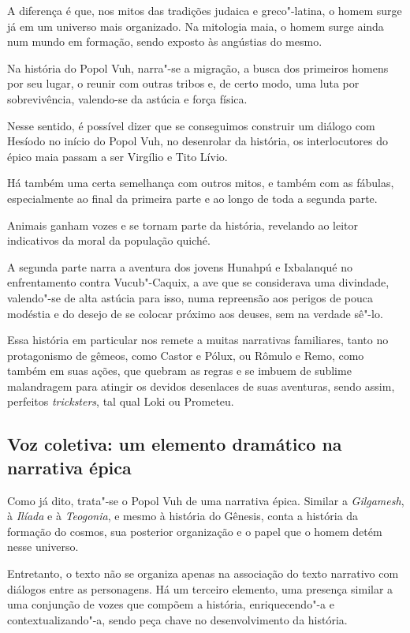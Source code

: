 \documentclass[12pt]{extarticle}
\begin{document}
A diferença é que, nos mitos das tradições judaica e greco"-latina, o
homem surge já em um universo mais organizado. Na mitologia maia, o
homem surge ainda num mundo em formação, sendo exposto às angústias do
mesmo.

Na história do Popol Vuh, narra"-se a migração, a busca dos primeiros
homens por seu lugar, o reunir com outras tribos e, de certo modo, uma
luta por sobrevivência, valendo-se da astúcia e força física.

Nesse sentido, é possível dizer que se conseguimos construir um diálogo
com Hesíodo no início do Popol Vuh, no desenrolar da história, os
interlocutores do épico maia passam a ser Virgílio e Tito Lívio.

Há também uma certa semelhança com outros mitos, e também com as
fábulas, especialmente ao final da primeira parte e ao longo de toda a
segunda parte.

Animais ganham vozes e se tornam parte da história, revelando ao leitor
indicativos da moral da população quiché.

A segunda parte narra a aventura dos jovens Hunahpú e Ixbalanqué no
enfrentamento contra Vucub"-Caquix, a ave que se considerava uma
divindade, valendo"-se de alta astúcia para isso, numa repreensão aos
perigos de pouca modéstia e do desejo de se colocar próximo aos deuses,
sem na verdade sê"-lo.




Essa história em particular nos remete a muitas narrativas familiares,
tanto no protagonismo de gêmeos, como Castor e Pólux, ou Rômulo e Remo,
como também em suas ações, que quebram as regras e se imbuem de sublime
malandragem para atingir os devidos desenlaces de suas aventuras, sendo
assim, perfeitos \textit{tricksters}, tal qual Loki ou Prometeu.

\subsection{Voz coletiva: um elemento dramático na narrativa épica}

Como já dito, trata"-se o Popol Vuh de uma narrativa épica. Similar a
\textit{Gilgamesh}, à \textit{Ilíada} e à \textit{Teogonia}, e mesmo à história do Gênesis, conta a
história da formação do cosmos, sua posterior organização e o papel que
o homem detém nesse universo.

Entretanto, o texto não se organiza apenas na associação do texto
narrativo com diálogos entre as personagens. Há um terceiro elemento,
uma presença similar a uma conjunção de vozes que compõem a história,
enriquecendo"-a e contextualizando"-a, sendo peça chave no desenvolvimento
da história.
\end{document}
